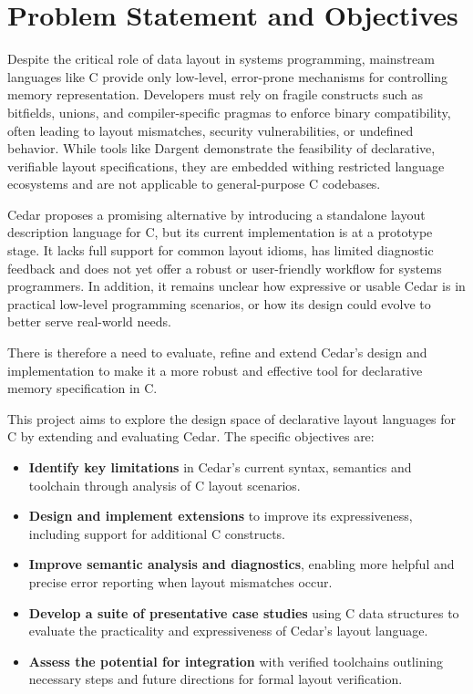 \documentclass[12pt]{article}
\begin{document}
\section{Problem Statement and Objectives}
\label{sec:problem}
Despite the critical role of data layout in systems programming, mainstream
languages like C provide only low-level, error-prone mechanisms for controlling
memory representation. Developers must rely on fragile constructs such as
bitfields, unions, and compiler-specific pragmas to enforce binary
compatibility, often leading to layout mismatches, security vulnerabilities, or
undefined behavior. While tools like Dargent demonstrate the feasibility of 
declarative, verifiable layout specifications, they are embedded withing 
restricted language ecosystems and are not applicable to general-purpose
C codebases.

Cedar proposes a promising alternative by introducing a standalone layout
description language for C, but its current implementation is at a 
prototype stage. It lacks full support for common layout idioms, has limited
diagnostic feedback and does not yet offer a robust or user-friendly workflow
for systems programmers. In addition, it remains unclear how expressive or
usable Cedar is in practical low-level programming scenarios, or how its design
could evolve to better serve real-world needs.

There is therefore a need to evaluate, refine and extend Cedar's design and
implementation to make it a more robust and effective tool for declarative 
memory specification in C.

This project aims to explore the design space of declarative layout
languages for C by extending and evaluating Cedar. The specific objectives
are:
\begin{itemize}
    \item \textbf{Identify key limitations} in Cedar's current syntax, semantics
    and toolchain through analysis of C layout scenarios.
    \item \textbf{Design and implement extensions} to improve its 
    expressiveness, including support for additional C constructs.
    \item \textbf{Improve semantic analysis and diagnostics}, enabling more
    helpful and precise error reporting when layout mismatches occur.
    \item \textbf{Develop a suite of presentative case studies} using C
    data structures to evaluate the practicality and expressiveness of Cedar's
    layout language.
    \item \textbf{Assess the potential for integration} with verified toolchains
    outlining necessary steps and future directions for formal layout
    verification.
\end{itemize}
\end{document}
